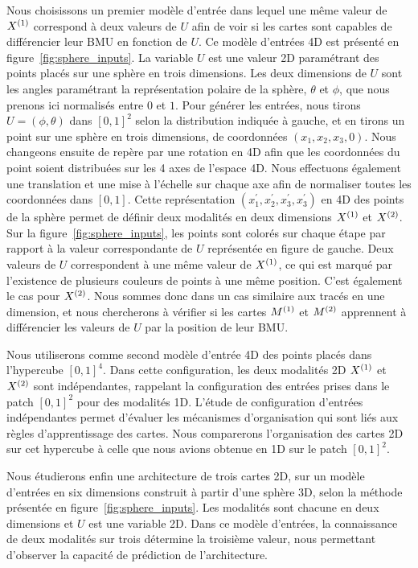\documentclass[../main]{subfiles}
\begin{document}
Nous choisissons un premier modèle d'entrée dans lequel une même valeur de $X^{({1})}$ correspond à deux valeurs de $U$ afin de voir si les cartes sont capables de différencier leur BMU en fonction de $U$.
Ce modèle d'entrées 4D est présenté en figure~\ref{fig:sphere_inputs}.
La variable $U$ est une valeur 2D paramétrant des points placés sur une sphère en trois dimensions.
Les deux dimensions de $U$ sont les angles paramétrant la représentation polaire de la sphère, $\theta$ et $\phi$, que nous prenons ici normalisés entre $0$ et $1$.
Pour générer les entrées, nous tirons $U = (\phi,\theta)$ dans $[0,1]^2$ selon la distribution indiquée à gauche, et en tirons un point sur une sphère en trois dimensions, de coordonnées $(x_1,x_2,x_3,0)$.
Nous changeons ensuite de repère par une rotation en 4D afin que les coordonnées du point soient distribuées sur les 4 axes de l'espace 4D. Nous effectuons également une translation et une mise à l'échelle sur chaque axe afin de normaliser toutes les coordonnées dans $[0,1]$.
Cette représentation $(x_1^\prime,x_2^\prime,x_3^\prime,x_3^\prime)$ en 4D des points de la sphère permet de définir deux modalités en deux dimensions $X^{({1})}$ et $X^{({2})}$. Sur la figure~\ref{fig:sphere_inputs}, les points sont colorés sur chaque étape par rapport à la valeur correspondante de $U$ représentée en figure de gauche.
Deux valeurs de $U$ correspondent à une même valeur de $X^{({1})}$, ce qui est marqué par l'existence de plusieurs couleurs de points à une même position. C'est également le cas pour $X^{({2})}$.
Nous sommes donc dans un cas similaire aux tracés en une dimension, et nous chercherons à vérifier si les cartes $M^{({1})}$ et $M^{({2})}$ apprennent à différencier les valeurs de $U$ par la position de leur BMU.


Nous utiliserons comme second modèle d'entrée 4D des points placés dans l'hypercube $[0,1]^4$. Dans cette configuration, les deux modalités 2D $X^{({1})}$ et $X^{({2})}$ sont indépendantes, rappelant la configuration des entrées prises dans le patch $[0,1]^2$ pour des modalités 1D. L'étude de configuration d'entrées indépendantes permet d'évaluer les mécanismes d'organisation qui sont liés aux règles d'apprentissage des cartes.
Nous comparerons l'organisation des cartes 2D sur cet hypercube à celle que nous avions obtenue en 1D sur le patch $[0,1]^2$. 

Nous étudierons enfin une architecture de trois cartes 2D, sur un modèle d'entrées en six dimensions construit à partir d'une sphère 3D, selon la méthode présentée en figure~\ref{fig:sphere_inputs}. Les modalités sont chacune en deux dimensions et $U$ est une variable 2D. Dans ce modèle d'entrées, la connaissance de deux modalités sur trois détermine la troisième valeur, nous permettant d'observer la capacité de prédiction de l'architecture.
\end{document}
